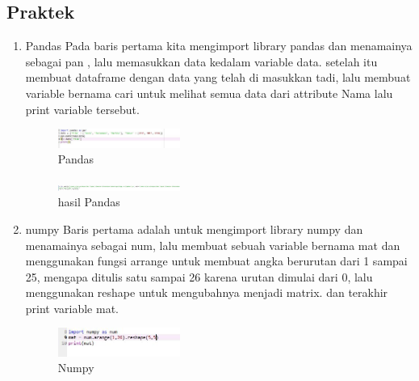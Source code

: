     \subsection{Praktek}
        \begin{enumerate}
            \item Pandas
            Pada baris pertama kita mengimport library pandas dan menamainya sebagai pan , lalu memasukkan data kedalam variable data. setelah itu membuat dataframe dengan data yang telah di masukkan tadi, lalu membuat variable bernama cari untuk melihat semua data dari attribute Nama lalu print variable tersebut.
            
            \begin{figure}[H]
            \includegraphics[width=4cm]{figures/1174039/chapter3/1.jpg}
            \centering
            \caption{Pandas}
            \end{figure}
            \begin{figure}[H]
                \includegraphics[width=4cm]{figures/1174039/chapter3/2.jpg}
                \centering
                \caption{hasil Pandas}
                \end{figure}
            \item numpy
            Baris pertama adalah untuk mengimport library numpy dan menamainya sebagai num, lalu membuat sebuah variable bernama mat dan menggunakan fungsi arrange untuk membuat angka berurutan dari 1 sampai 25, mengapa ditulis satu sampai 26 karena urutan dimulai dari 0,  lalu menggunakan reshape untuk mengubahnya menjadi matrix. dan terakhir print variable mat.
            \begin{figure}[H]
                \includegraphics[width=4cm]{figures/1174039/chapter3/3.jpg}
                \centering
                \caption{Numpy}
                \end{figure}


\end{enumerate}
